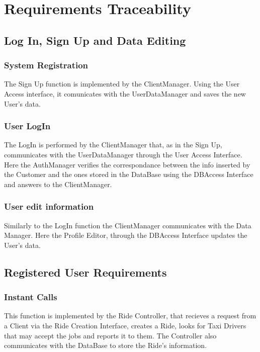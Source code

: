 \section{Requirements Traceability}
	\subsection {Log In, Sign Up and Data Editing}

		\subsubsection{System Registration}
		The Sign Up function is implemented by the ClientManager. Using the User Access interface, it comunicates with the UserDataManager and saves the new User's data.
		
		\subsubsection{User LogIn}
		The LogIn is performed by the ClientManager that, as in the Sign Up, communicates with the UserDataManager through the User Access Interface. Here the AuthManager verifies the correspondance between the info inserted by the Customer and the ones stored in the DataBase using the DBAccess Interface and answers to the ClientManager.
		
		\subsubsection{User edit information}
		Similarly to the LogIn function the ClientManager communicates with the Data Manager. Here the Profile Editor, through the DBAccess Interface updates the User's data.
		
		\newpage
	\subsection {Registered User Requirements}
	
		
		\subsubsection{Instant Calls}
		This function is implemented by the Ride Controller, that recieves a request from a Client via the Ride Creation Interface, creates a Ride, looks for Taxi Drivers that may accept the jobs and reports it to them. The Controller also communicates with the DataBase to store the Ride's information. 
		
